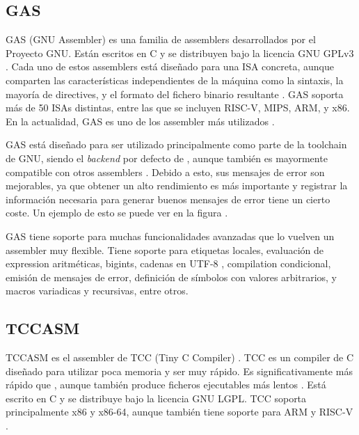 \subsection{GAS}

GAS (GNU Assembler) \parencite{GNUas} es una familia de \glspl{assembler}
desarrollados por el Proyecto GNU. Están escritos en C y se distribuyen bajo la
licencia GNU GPLv3 \parencite{gpl}. Cada uno de estos \glspl{assembler} está
diseñado para una \gls{ISA} concreta, aunque comparten las características
independientes de la máquina como la sintaxis, la mayoría de \glspl{directive},
y el formato del fichero binario resultante \parencite{as-manual}. GAS soporta
más de 50 \glspl{ISA} distintas, entre las que se incluyen RISC-V, MIPS, ARM, y
x86. En la actualidad, GAS es uno de los \gls{assembler} más utilizados
\parencite{assembler-usage}.

GAS está diseñado para ser utilizado principalmente como parte de la
\gls{toolchain} de GNU, siendo el \textit{backend} por defecto de ,
aunque también es mayormente compatible con otros \glspl{assembler}
\parencite{as-manual}. Debido a esto, sus mensajes de error son mejorables, ya
que obtener un alto rendimiento es más importante y registrar la información
necesaria para generar buenos mensajes de error tiene un cierto coste. Un
ejemplo de esto se puede ver en la figura .


GAS tiene soporte para muchas funcionalidades avanzadas que lo vuelven un
\gls{assembler} muy flexible. Tiene soporte para etiquetas locales, evaluación
de \gls{expression} aritméticas, \glspl{bigint}, cadenas en UTF-8
\parencite{UTF-8}, \gls{compilation} condicional, emisión de mensajes de error,
definición de símbolos con valores arbitrarios, y macros variadicas y
recursivas, entre otros.

\subsection{TCCASM}

TCCASM es el \gls{assembler} de TCC (Tiny C Compiler) \parencite{tcc}. TCC es un
\gls{compiler} de C diseñado para utilizar poca memoria y ser muy rápido. Es
significativamente más rápido  que
, aunque también produce ficheros ejecutables más lentos
\parencite{tcc-speed}. Está escrito en C y se distribuye bajo la licencia GNU
LGPL. TCC soporta principalmente x86 y x86-64, aunque también tiene soporte para
ARM y RISC-V \parencite{tcc-manual} \parencite{tcc-arm} \parencite{tcc-riscv}.

